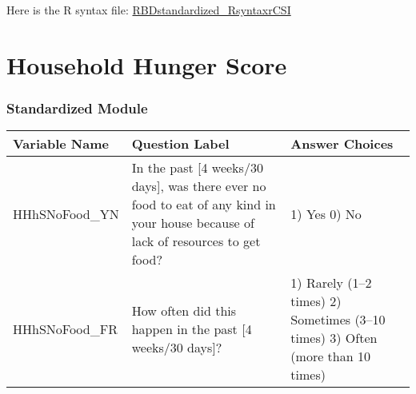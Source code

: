\documentclass[
]{article}
\begin{document}
Here is the R syntax file:
\href{https://www.dropbox.com/s/gsj4tvadww9v3q4/RBDstandardized_questionnairerCSI.xlsx?dl=0}{RBDstandardized\_RsyntaxrCSI}

\hypertarget{household-hunger-score}{%
\section{Household Hunger Score}\label{household-hunger-score}}

\hypertarget{standardized-module-1}{%
\subsubsection{Standardized Module}\label{standardized-module-1}}

\begin{longtable}[]{@{}lll@{}}
\toprule
\begin{minipage}[b]{0.17\columnwidth}\raggedright
Variable Name\strut
\end{minipage} & \begin{minipage}[b]{0.56\columnwidth}\raggedright
Question Label\strut
\end{minipage} & \begin{minipage}[b]{0.17\columnwidth}\raggedright
Answer Choices\strut
\end{minipage}\tabularnewline
\midrule
\endhead
\begin{minipage}[t]{0.17\columnwidth}\raggedright
HHhSNoFood\_YN\strut
\end{minipage} & \begin{minipage}[t]{0.56\columnwidth}\raggedright
In the past {[}4 weeks/30 days{]}, was there ever no food to eat of any kind in your house because of lack of resources to get food?\strut
\end{minipage} & \begin{minipage}[t]{0.17\columnwidth}\raggedright
1) Yes 0) No\strut
\end{minipage}\tabularnewline
\begin{minipage}[t]{0.17\columnwidth}\raggedright
HHhSNoFood\_FR\strut
\end{minipage} & \begin{minipage}[t]{0.56\columnwidth}\raggedright
How often did this happen in the past {[}4 weeks/30 days{]}?\strut
\end{minipage} & \begin{minipage}[t]{0.17\columnwidth}\raggedright
1) Rarely (1--2 times) 2) Sometimes (3--10 times) 3) Often (more than 10 times)\strut

\end{minipage}
\end{longtable}
\end{document}
